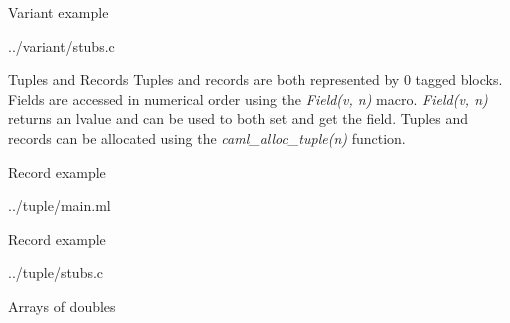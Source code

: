 \documentclass{beamer}
\begin{document}
\begin{frame}[fragile,shrink=20]{Variant example}
\begin{lstinputlisting}[language=ML]{../variant/stubs.c}
\end{lstinputlisting}
\end{frame}

\begin{frame}{Tuples and Records}
Tuples and records are both represented by 0 tagged blocks.  Fields are accessed in numerical order using the
\emph{Field(v, n)} macro.  \emph{Field(v, n)} returns an lvalue and can be used to both set and get the field.
Tuples and records can be allocated using the \emph{caml\_alloc\_tuple(n)} function.
\end{frame}

\begin{frame}[fragile]{Record example}
\begin{lstinputlisting}[language=ML]{../tuple/main.ml}
\end{lstinputlisting}
\end{frame}

\begin{frame}[fragile]{Record example}
\begin{lstinputlisting}[language=C]{../tuple/stubs.c}
\end{lstinputlisting}
\end{frame}

\begin{frame}{Arrays of doubles}
\end{frame}
\end{document}
